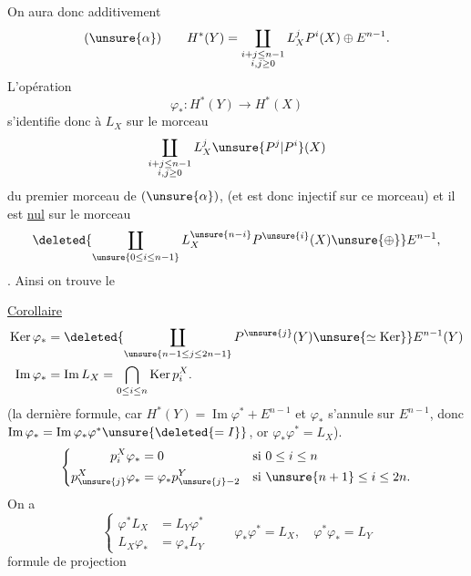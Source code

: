On aura donc additivement
\[
(\unsure{\alpha})\qquad H^*(Y)=\coprod_{\substack{i+j\leq n-1\\i,j\geq0}}L_X^jP^i(X)\oplus E^{n-1}.
\]
L'opération
\[\varphi_*:H^*(Y)\longrightarrow H^*(X)\]
s'identifie donc à $L_X$ sur le morceau
\[\coprod_{\substack{i+j\leq n-1\\i,j\geq0}}L_X^j\unsure{P^j|P^i}(X)\]
du premier morceau de $(\unsure{\alpha})$, (et est  donc injectif sur ce morceau) et il est \uline{nul} sur le morceau
\[
\deleted{\coprod_{\unsure{0\leq i\leq n-1}}L_X^{\unsure{n-i}}P^{\unsure{i}}(X)\unsure{\oplus}}E^{n-1},
\]
. Ainsi on trouve le

\uline{Corollaire}
\[
\begin{aligned}
\operatorname{Ker}\varphi_*&=\deleted{\coprod_{\unsure{n-1\leq j\leq2n-1}}P^{\unsure{j}}(Y)\unsure{\simeq\operatorname{Ker}}}E^{n-1}(Y)\\
\operatorname{Im}\varphi_*&=\operatorname{Im}L_X=\bigcap_{0\leq i\leq n}\operatorname{Ker}p_i^X.
\end{aligned}
\]
(la dernière formule, car $H^*(Y)=\operatorname{Im}\varphi^*+E^{n-1}$ et $\varphi_*$ s'annule sur $E^{n-1}$, donc $\operatorname{Im}\varphi_*=\operatorname{Im}\varphi_*\varphi^*\unsure{\deleted{=I}}$, or $\varphi_*\varphi^*=L_X$).
\[
\left\{\begin{aligned}
p_i^X\varphi_*&=0 &&\text{si }0\leq i\leq n\\
p_{\unsure{j}}^X\varphi_*&=\varphi_*p_{\unsure{j}-2}^Y &&\text{si }\unsure{n+1}\leq i\leq2n.
\end{aligned}\right.
\]
On a
\[
\left\{\begin{aligned}
\varphi^*L_X&=L_Y\varphi^*\\
L_X\varphi_*&=\varphi_*L_Y
\end{aligned}\right.
\qquad
\varphi_*\varphi^*=L_X,\quad\varphi^*\varphi_*=L_Y
\]
formule de projection

